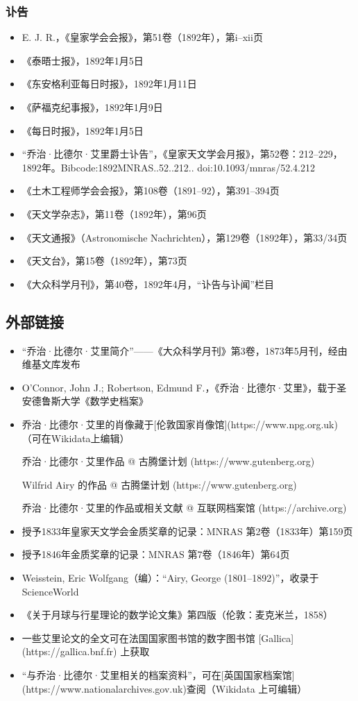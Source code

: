 \subsubsection{讣告}
\begin{itemize}
\item E. J. R.，《皇家学会会报》，第51卷（1892年），第i–xii页
\item 《泰晤士报》，1892年1月5日
\item 《东安格利亚每日时报》，1892年1月11日
\item 《萨福克纪事报》，1892年1月9日
\item 《每日时报》，1892年1月5日
\item “乔治·比德尔·艾里爵士讣告”，《皇家天文学会月报》，第52卷：212–229，1892年。Bibcode:1892MNRAS..52..212.. doi:10.1093/mnras/52.4.212
\item 《土木工程师学会会报》，第108卷（1891–92），第391–394页
\item 《天文学杂志》，第11卷（1892年），第96页
\item 《天文通报》（Astronomische Nachrichten），第129卷（1892年），第33/34页
\item 《天文台》，第15卷（1892年），第73页
\item 《大众科学月刊》，第40卷，1892年4月，“讣告与讣闻”栏目
\end{itemize}
\subsection{外部链接}
\begin{itemize}
\item “乔治·比德尔·艾里简介”——《大众科学月刊》第3卷，1873年5月刊，经由维基文库发布
\item O'Connor, John J.; Robertson, Edmund F.，《乔治·比德尔·艾里》，载于圣安德鲁斯大学《数学史档案》
\item 乔治·比德尔·艾里的肖像藏于[伦敦国家肖像馆](https://www.npg.org.uk)（可在Wikidata上编辑）
\item [乔治·比德尔·艾里作品 @ 古腾堡计划](https://www.gutenberg.org)
\item [Wilfrid Airy 的作品 @ 古腾堡计划](https://www.gutenberg.org)
\item [乔治·比德尔·艾里的作品或相关文献 @ 互联网档案馆](https://archive.org)
\item 授予1833年皇家天文学会金质奖章的记录：MNRAS 第2卷（1833年）第159页
\item 授予1846年金质奖章的记录：MNRAS 第7卷（1846年）第64页
\item Weisstein, Eric Wolfgang（编）：“Airy, George (1801–1892)”，收录于 ScienceWorld
\item 《关于月球与行星理论的数学论文集》第四版（伦敦：麦克米兰，1858）
\item 一些艾里论文的全文可在法国国家图书馆的数字图书馆 [Gallica](https://gallica.bnf.fr) 上获取
\item “与乔治·比德尔·艾里相关的档案资料”，可在[英国国家档案馆](https://www.nationalarchives.gov.uk)查阅（Wikidata 上可编辑）
\end{itemize}
